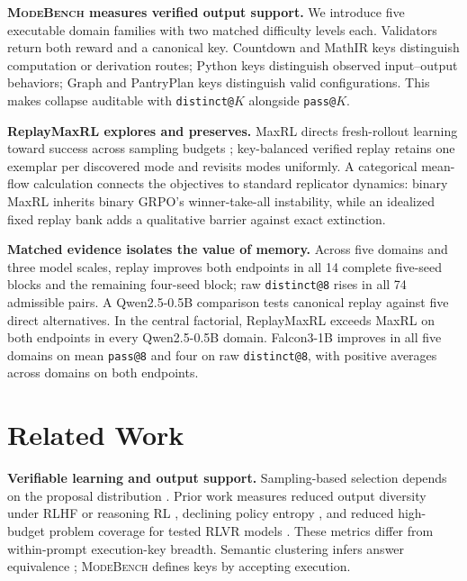 \documentclass{article}
\newcommand{\1}{\mathbf 1}
\newcommand{\mb}{\textsc{ModeBench}}
\theoremstyle{remark}
\theoremstyle{definition}
\theoremstyle{plain}
\begin{document}
\begin{list}{\textbullet}{%
  \setlength{\leftmargin}{0pt}%
  \setlength{\labelwidth}{0pt}%
  \setlength{\labelsep}{0.65em}%
  \setlength{\itemindent}{0pt}%
  \setlength{\listparindent}{0pt}%
  \setlength{\parsep}{0pt}%
  \setlength{\topsep}{0.35em}%
  \setlength{\itemsep}{0.35em}}
  \item \textbf{\mb{} measures verified output support.} We introduce
  five executable domain families with two matched difficulty levels each.
  Validators return both reward and a canonical key. Countdown and MathIR keys
  distinguish computation or derivation routes; Python keys distinguish
  observed input--output behaviors; Graph and PantryPlan keys distinguish valid
  configurations. This makes collapse auditable with \texttt{distinct@}$K$
  alongside \texttt{pass@}$K$.

  \item \textbf{ReplayMaxRL explores and preserves.} MaxRL directs fresh-rollout
  learning toward success across sampling budgets \citep{tajwar2026maxrl};
  key-balanced verified replay retains one exemplar per discovered mode and
  revisits modes uniformly. A categorical mean-flow calculation connects the
  objectives to standard replicator dynamics: binary MaxRL inherits binary
  GRPO's winner-take-all instability, while an idealized fixed replay bank adds
  a qualitative barrier against exact extinction.

  \item \textbf{Matched evidence isolates the value of memory.} Across five
  domains and three model scales, replay improves both endpoints in all 14
  complete five-seed blocks and the remaining four-seed block; raw
  \texttt{distinct@8} rises in all 74 admissible pairs. A Qwen2.5-0.5B
  comparison tests canonical replay against five direct alternatives.
  In the central factorial, ReplayMaxRL exceeds MaxRL on both endpoints in
  every Qwen2.5-0.5B domain. Falcon3-1B improves in all five domains on mean
  \texttt{pass@8} and four on raw \texttt{distinct@8}, with positive averages
  across domains on both endpoints.
\end{list}

\section{Related Work}
\label{sec:related}

\noindent\textbf{Verifiable learning and output support.}
Sampling-based selection depends on the proposal distribution
\citep{brown2024monkeys,snell2024testtime}. Prior work measures reduced output
diversity under RLHF or reasoning RL \citep{kirk2024understanding,dang2025diversity},
declining policy entropy \citep{cui2025entropy}, and reduced high-budget problem
coverage for tested RLVR models \citep{yue2025rlvrlimit}. These metrics differ from
within-prompt execution-key breadth. Semantic clustering infers answer
equivalence \citep{farquhar2024detecting}; \mb{} defines keys by accepting execution.
\end{document}
